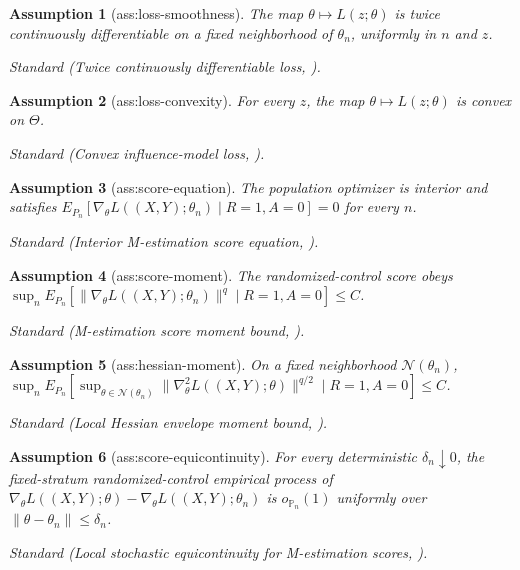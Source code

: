\documentclass{article}
\newtheorem{assumption}{Assumption}
\begin{document}
\begin{assumption}[ass:loss-smoothness]\label{ass:loss-smoothness}
The map \(\theta\mapsto L(z;\theta)\) is twice continuously differentiable on a fixed neighborhood of \(\theta_n\), uniformly in \(n\) and \(z\).
\par\smallskip\noindent\emph{Standard} (Twice continuously differentiable loss, \cite{YangLiWuYang2026}).
\end{assumption}

\begin{assumption}[ass:loss-convexity]\label{ass:loss-convexity}
For every \(z\), the map \(\theta\mapsto L(z;\theta)\) is convex on \(\Theta\).
\par\smallskip\noindent\emph{Standard} (Convex influence-model loss, \cite{YangLiWuYang2026}).
\end{assumption}

\begin{assumption}[ass:score-equation]\label{ass:score-equation}
The population optimizer is interior and satisfies \(E_{P_n}[\nabla_\theta L((X,Y);\theta_n)\mid R=1,A=0]=0\) for every \(n\).
\par\smallskip\noindent\emph{Standard} (Interior M-estimation score equation, \cite{YangLiWuYang2026}).
\end{assumption}

\begin{assumption}[ass:score-moment]\label{ass:score-moment}
The randomized-control score obeys \(\sup_nE_{P_n}[\|\nabla_\theta L((X,Y);\theta_n)\|^q\mid R=1,A=0]\le C\).
\par\smallskip\noindent\emph{Standard} (M-estimation score moment bound, \cite{YangLiWuYang2026}).
\end{assumption}

\begin{assumption}[ass:hessian-moment]\label{ass:hessian-moment}
On a fixed neighborhood \(\mathcal N(\theta_n)\), \(\sup_nE_{P_n}[\sup_{\theta\in\mathcal N(\theta_n)}\|\nabla_\theta^2L((X,Y);\theta)\|^{q/2}\mid R=1,A=0]\le C\).
\par\smallskip\noindent\emph{Standard} (Local Hessian envelope moment bound, \cite{YangLiWuYang2026}).
\end{assumption}

\begin{assumption}[ass:score-equicontinuity]\label{ass:score-equicontinuity}
For every deterministic \(\delta_n\downarrow0\), the fixed-stratum randomized-control empirical process of \(\nabla_\theta L((X,Y);\theta)-\nabla_\theta L((X,Y);\theta_n)\) is \(o_{\mathbb P_n}(1)\) uniformly over \(\|\theta-\theta_n\|\le\delta_n\).
\par\smallskip\noindent\emph{Standard} (Local stochastic equicontinuity for M-estimation scores, \cite{YangLiWuYang2026}).
\end{assumption}
\end{document}
